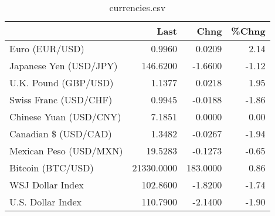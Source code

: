 \documentclass{article}%
\begin{document}
%


\begin{table}[htbp]%
\caption{currencies.csv}%
\centering%
\begin{adjustbox}{width=1\textwidth}%
\begin{tabular}{lrrr}
\toprule
                       &       Last &     Chng &  \%Chng \\
\midrule
        Euro (EUR/USD) &     0.9960 &   0.0209 &   2.14 \\
Japanese Yen (USD/JPY) &   146.6200 &  -1.6600 &  -1.12 \\
  U.K. Pound (GBP/USD) &     1.1377 &   0.0218 &   1.95 \\
 Swiss Franc (USD/CHF) &     0.9945 &  -0.0188 &  -1.86 \\
Chinese Yuan (USD/CNY) &     7.1851 &   0.0000 &   0.00 \\
  Canadian \$ (USD/CAD) &     1.3482 &  -0.0267 &  -1.94 \\
Mexican Peso (USD/MXN) &    19.5283 &  -0.1273 &  -0.65 \\
     Bitcoin (BTC/USD) & 21330.0000 & 183.0000 &   0.86 \\
      WSJ Dollar Index &   102.8600 &  -1.8200 &  -1.74 \\
     U.S. Dollar Index &   110.7900 &  -2.1400 &  -1.90 \\
\bottomrule
\end{tabular}
%
\end{adjustbox}%
\end{table}

%
\end{document}
